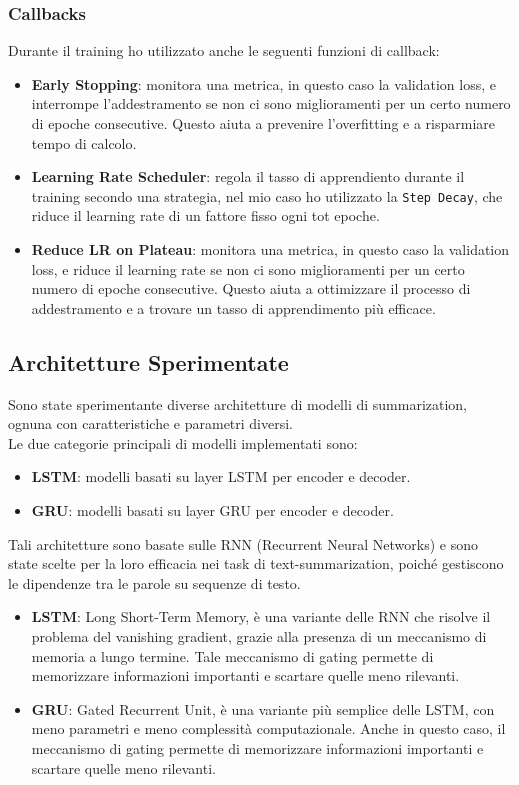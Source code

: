 \subsubsection{Callbacks}
Durante il training ho utilizzato anche le seguenti funzioni di callback:
\begin{itemize}
    \item \textbf{Early Stopping}: monitora una metrica, in questo caso la validation loss, e interrompe l'addestramento se non ci sono miglioramenti per un certo numero di epoche consecutive. Questo aiuta a prevenire l'overfitting e a risparmiare tempo di calcolo.
    \item \textbf{Learning Rate Scheduler}: regola il tasso di apprendiento durante il training secondo una strategia, nel mio caso ho utilizzato la \texttt{Step Decay}, che riduce il learning rate di un fattore fisso ogni tot epoche.
    \item \textbf{Reduce LR on Plateau}: monitora una metrica, in questo caso la validation loss, e riduce il learning rate se non ci sono miglioramenti per un certo numero di epoche consecutive. Questo aiuta a ottimizzare il processo di addestramento e a trovare un tasso di apprendimento più efficace.
\end{itemize}

\subsection{Architetture Sperimentate}
Sono state sperimentante diverse architetture di modelli di summarization, ognuna con caratteristiche e parametri diversi.\\
Le due categorie principali di modelli implementati sono:
\begin{itemize}
    \item \textbf{LSTM}: modelli basati su layer LSTM per encoder e decoder.
    \item \textbf{GRU}: modelli basati su layer GRU per encoder e decoder.
\end{itemize}
Tali architetture sono basate sulle RNN (Recurrent Neural Networks) e sono state scelte per la loro efficacia nei task di text-summarization, poiché 
gestiscono le dipendenze tra le parole su sequenze di testo.\\ 
\begin{itemize}
    \item \textbf{LSTM}: Long Short-Term Memory, è una variante delle RNN che risolve il problema del vanishing gradient, grazie alla presenza di un meccanismo di memoria a lungo termine.
    Tale meccanismo di gating permette di memorizzare informazioni importanti e scartare quelle meno rilevanti.
    \item \textbf{GRU}: Gated Recurrent Unit, è una variante più semplice delle LSTM, con meno parametri e meno complessità computazionale.
    Anche in questo caso, il meccanismo di gating permette di memorizzare informazioni importanti e scartare quelle meno rilevanti.
\end{itemize}

